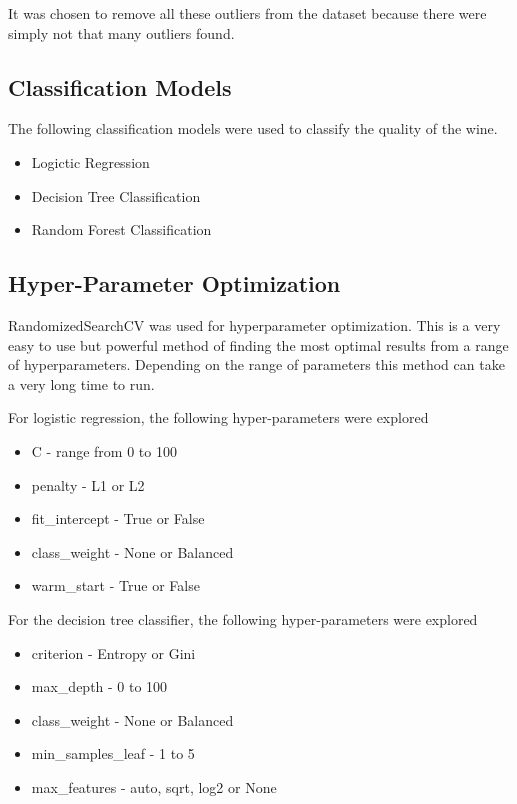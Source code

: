 It was chosen to remove all these outliers from the dataset because there were simply not that many outliers found.

\subsection{Classification Models}

The following classification models were used to classify the quality of the wine. 

\begin{itemize}
  \item Logictic Regression
  \item Decision Tree Classification
  \item Random Forest Classification
\end{itemize}

\subsection{Hyper-Parameter Optimization}

RandomizedSearchCV was used for hyperparameter optimization. This is a very easy to use but powerful method of finding the most optimal results from a range of hyperparameters. Depending on the range of parameters this method can take a very long time to run.

For logistic regression, the following hyper-parameters were explored

\begin{itemize}
  \item C - range from 0 to 100
  \item penalty - L1 or L2
  \item fit\_intercept - True or False
  \item class\_weight - None or Balanced
  \item warm\_start - True or False
\end{itemize}

For the decision tree classifier, the following hyper-parameters were explored

\begin{itemize}
  \item criterion - Entropy or Gini
  \item max\_depth - 0 to 100
  \item class\_weight - None or Balanced
  \item min\_samples\_leaf - 1 to 5
  \item max\_features - auto, sqrt, log2 or None
\end{itemize}


